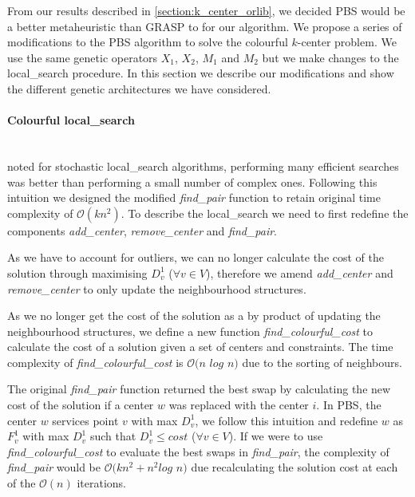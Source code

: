 From our results described in \cref{section:k_center_orlib}, we decided PBS would be a better metaheuristic than GRASP to for our algorithm. We propose a series of modifications to the PBS algorithm to solve the colourful $k$-center problem. We use the same genetic operators $X_1$, $X_2$, $M_1$ and $M_2$ but we make changes to the \gls{local_search} procedure. In this section we describe our modifications and show the different genetic architectures we have considered.

\paragraph{Colourful \gls{local_search}}~\\
\citeauthor{pullan_memetic_2008} noted for stochastic \gls{local_search} algorithms, performing many efficient searches was better than performing a small number of complex ones. Following this intuition we designed the modified \emph{find\_pair} function to retain original time complexity of $\mathcal{O}(kn^2)$. To describe the \gls{local_search} we need to first redefine the components \emph{add\_center}, \emph{remove\_center} and \emph{find\_pair}.

As we have to account for outliers, we can no longer calculate the cost of the solution through maximising $D^1_v$ ($\forall v\in V$), therefore we amend \emph{add\_center} and \emph{remove\_center} to only update the neighbourhood structures.

\begin{minipage}{0.48\textwidth}
    
\end{minipage}
\hspace{0.02\textwidth}
\begin{minipage}{0.48\textwidth}
    
\end{minipage}

As we no longer get the cost of the solution as a by product of updating the neighbourhood structures, we define a new function \emph{find\_colourful\_cost} to calculate the cost of a solution given a set of centers and constraints. The time complexity of \emph{find\_colourful\_cost} is $\mathcal{O}(n$ $log$ $n)$ due to the sorting of neighbours.



The original \emph{find\_pair} function returned the best swap by calculating the new cost of the solution if a center $w$ was replaced with the center $i$. In PBS, the center $w$ services point $v$ with max $D^1_v$, we follow this intuition and redefine $w$ as $F^1_v$ with max $D^1_v$ such that $D^1_v\leq cost$ ($\forall v\in V$). If we were to use \emph{find\_colourful\_cost} to evaluate the best swaps in \emph{find\_pair}, the complexity of \emph{find\_pair} would be $\mathcal{O}(kn^2+n^2log$ $n)$ due recalculating the solution cost at each of the $\mathcal{O}(n)$ iterations.

